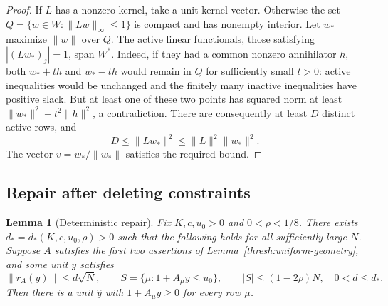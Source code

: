 \documentclass[11pt,a4paper]{article}
\numberwithin{equation}{section}
\newtheorem{lemma}[theorem]{Lemma}
\theoremstyle{definition}
\theoremstyle{remark}
\begin{document}
\begin{proof}
If $L$ has a nonzero kernel, take a unit kernel vector.  Otherwise the
set $Q=\{w\in W:\|Lw\|_\infty\leq1\}$ is compact and has nonempty
interior.  Let $w_*$ maximize $\|w\|$ over $Q$.  The active linear
functionals, those satisfying $|(Lw_*)_j|=1$, span $W^*$.  Indeed, if
they had a common nonzero annihilator $h$, both $w_*+th$ and $w_*-th$
would remain in $Q$ for sufficiently small $t>0$: active inequalities
would be unchanged and the finitely many inactive inequalities have
positive slack.  But at least one of these two points has squared norm
at least $\|w_*\|^2+t^2\|h\|^2$, a contradiction.
There are consequently at least $D$ distinct active rows, and
\[
 D\leq\|Lw_*\|^2\leq\|L\|^2\|w_*\|^2.
\]
The vector $v=w_*/\|w_*\|$ satisfies the required bound.
\end{proof}

\subsection{Repair after deleting constraints}

\begin{lemma}[Deterministic repair]
\label{thresh:repair}
Fix $K,c,u_0>0$ and $0<\rho<1/8$.  There exists
$d_*=d_*(K,c,u_0,\rho)>0$ such that the following holds for all
sufficiently large $N$.  Suppose $A$ satisfies the first two assertions
of Lemma~\ref{thresh:uniform-geometry}, and some unit $y$ satisfies
\[
 \|r_A(y)\|\leq d\sqrt N,
 \qquad
 S=\{\mu:1+A_\mu y\leq u_0\},
 \qquad |S|\leq(1-2\rho)N,
 \quad 0<d\leq d_*.
\]
Then there is a unit $\widehat y$ with $1+A_\mu\widehat y\geq0$ for
every row $\mu$.
\end{lemma}
\end{document}
